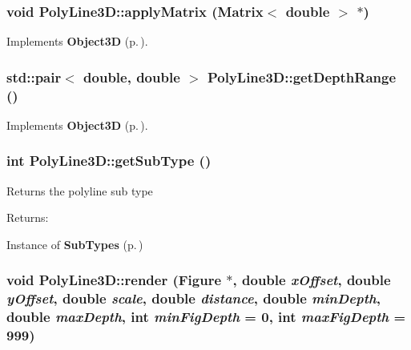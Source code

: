 \subsubsection{\setlength{\rightskip}{0pt plus 5cm}void Poly\-Line3D::apply\-Matrix ({\bf Matrix}$<$ double $>$ $\ast$)\hspace{0.3cm}{\tt  [virtual]}}\label{classPolyLine3D_a5}




Implements {\bf Object3D} {\rm (p.\,\pageref{classObject3D_a2})}.
\subsubsection{\setlength{\rightskip}{0pt plus 5cm}std::pair$<$ double, double $>$ Poly\-Line3D::get\-Depth\-Range ()\hspace{0.3cm}{\tt  [virtual]}}\label{classPolyLine3D_a4}




Implements {\bf Object3D} {\rm (p.\,\pageref{classObject3D_a0})}.
\subsubsection{\setlength{\rightskip}{0pt plus 5cm}int Poly\-Line3D::get\-Sub\-Type ()\hspace{0.3cm}{\tt  [inline]}}\label{classPolyLine3D_a3}


Returns the polyline sub type \begin{Desc}
\item[Returns: ]\par
Instance of {\bf Sub\-Types} {\rm (p.\,\pageref{classPolyLine3D_s5})} \end{Desc}
\subsubsection{\setlength{\rightskip}{0pt plus 5cm}void Poly\-Line3D::render ({\bf Figure} $\ast$, double {\em x\-Offset}, double {\em y\-Offset}, double {\em scale}, double {\em distance}, double {\em min\-Depth}, double {\em max\-Depth}, int {\em min\-Fig\-Depth} = 0, int {\em max\-Fig\-Depth} = 999)\hspace{0.3cm}{\tt  [virtual]}}\label{classPolyLine3D_a6}




